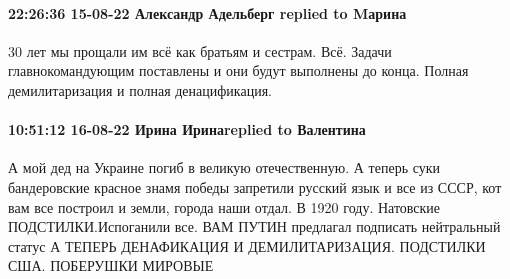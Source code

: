  
 
 
 
 

\paragraph{22:26:36 15-08-22 Александр Адельберг replied to Mарина}

30 лет мы прощали им всё как братьям и сестрам. Всё. Задачи главнокомандующим
поставлены и они будут выполнены до конца.
Полная демилитаризация и полная денацификация.

\paragraph{10:51:12 16-08-22 Ирина Иринаreplied to Валентина}

\obeycr
А мой дед на Украине погиб в великую отечественную.
А теперь суки бандеровские красное знамя победы запретили русский язык и все из СССР, кот вам все построил и земли, города наши отдал. В 1920 году.
Натовские ПОДСТИЛКИ.Испоганили все.
ВАМ ПУТИН предлагал подписать нейтральный статус
А ТЕПЕРЬ ДЕНАФИКАЦИЯ И ДЕМИЛИТАРИЗАЦИЯ.
ПОДСТИЛКИ США.
ПОБЕРУШКИ МИРОВЫЕ
\restorecr
